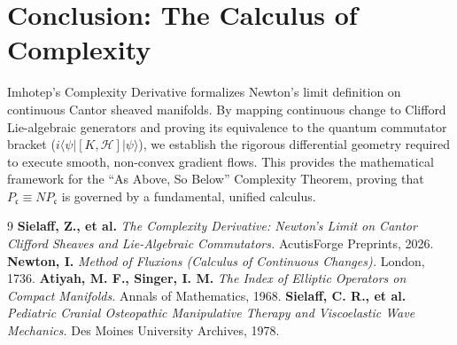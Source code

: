 \documentclass[11pt,twocolumn]{article}
\begin{document}
\section{Conclusion: The Calculus of Complexity}
Imhotep's Complexity Derivative formalizes Newton's limit definition on continuous Cantor sheaved manifolds. By mapping continuous change to Clifford Lie-algebraic generators and proving its equivalence to the quantum commutator bracket ($i \langle\psi| [K, \mathcal{H}] |\psi\rangle$), we establish the rigorous differential geometry required to execute smooth, non-convex gradient flows. This provides the mathematical framework for the ``As Above, So Below'' Complexity Theorem, proving that $P_{\mathfrak{c}} \equiv NP_{\mathfrak{c}}$ is governed by a fundamental, unified calculus.

\begin{thebibliography}{9}
\textbf{Sielaff, Z., et al.} \textit{The Complexity Derivative: Newton's Limit on Cantor Clifford Sheaves and Lie-Algebraic Commutators.} AcutisForge Preprints, 2026.
\textbf{Newton, I.} \textit{Method of Fluxions (Calculus of Continuous Changes).} London, 1736.
\textbf{Atiyah, M. F., Singer, I. M.} \textit{The Index of Elliptic Operators on Compact Manifolds.} Annals of Mathematics, 1968.
\textbf{Sielaff, C. R., et al.} \textit{Pediatric Cranial Osteopathic Manipulative Therapy and Viscoelastic Wave Mechanics.} Des Moines University Archives, 1978.
\end{thebibliography}
\end{document}
